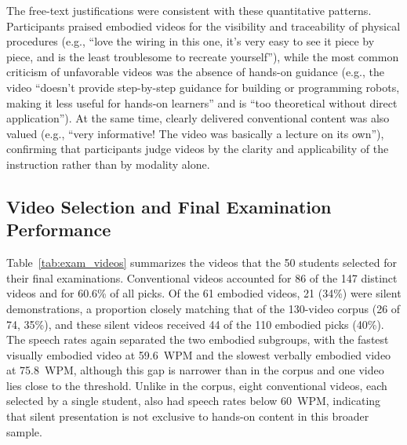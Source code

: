 \documentclass[fleqn,10pt]{JLA_article} %
\begin{document}
The free-text justifications were consistent with these quantitative patterns. Participants praised embodied videos for the visibility and traceability of physical procedures (e.g., ``love the wiring in this one, it's very easy to see it piece by piece, and is the least troublesome to recreate yourself''), while the most common criticism of unfavorable videos was the absence of hands-on guidance (e.g., the video ``doesn't provide step-by-step guidance for building or programming robots, making it less useful for hands-on learners'' and is ``too theoretical without direct application''). At the same time, clearly delivered conventional content was also valued (e.g., ``very informative! The video was basically a lecture on its own''), confirming that participants judge videos by the clarity and applicability of the instruction rather than by modality alone.

\subsection{Video Selection and Final Examination Performance}
\label{sec:exam_results}

Table~\ref{tab:exam_videos} summarizes the videos that the 50 students selected for their final examinations. Conventional videos accounted for 86 of the 147 distinct videos and for 60.6\% of all picks. Of the 61 embodied videos, 21 (34\%) were silent demonstrations, a proportion closely matching that of the 130-video corpus (26 of 74, 35\%), and these silent videos received 44 of the 110 embodied picks (40\%). The speech rates again separated the two embodied subgroups, with the fastest visually embodied video at 59.6~WPM and the slowest verbally embodied video at 75.8~WPM, although this gap is narrower than in the corpus and one video lies close to the threshold. Unlike in the corpus, eight conventional videos, each selected by a single student, also had speech rates below 60~WPM, indicating that silent presentation is not exclusive to hands-on content in this broader sample.
\end{document}
